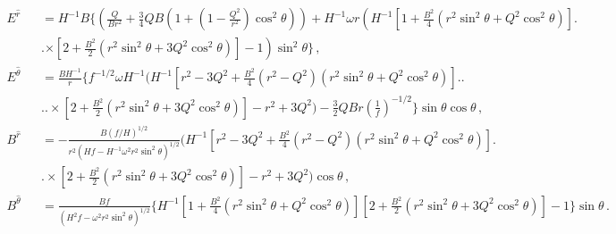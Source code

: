 \documentclass[showpacs,twocolumn,superscriptaddress]{revtex4}
\begin{document}
\begin{widetext}
\begin{eqnarray}
%
\label{e1}E^{\hat r} &&= H^{-1}B\Bigg\{
\left(\frac{Q}{Br^2}+\frac{3}{4}Q
B\left(1+\left(1-\frac{Q^2}{r^2}\right)\cos^2\theta\right)\right)
 +H^{-1}\omega r\left(H^{-1}\left[1+\frac{B^2}{4}\left(r^2\sin^2\theta
+
Q^2\cos^2\theta\right)\right]\right.\Bigg.\nonumber\\
%
&&\Bigg.\left.\times \left[2+\frac{B^2}{2}\left(r^2\sin^2\theta +
3Q^2\cos^2\theta\right)\right]-1\right)\sin^2\theta\Bigg\} \, ,\\
%
\label{e2}  E^{\hat \theta}&&
=\frac{BH^{-1}}{r}\Bigg\{f^{-1/2}\omega
H^{-1}\Bigg(H^{-1}\left[r^2-3Q^2+\frac{B^2}{4}\left(
r^2-Q^2\right)\left(r^2\sin^2\theta +
Q^2\cos^2\theta\right)\right]\Bigg.\Bigg.\nonumber\\
%
&&\Bigg.\Bigg.\times \left[2+\frac{B^2}{2}\left(r^2\sin^2\theta
+
3Q^2\cos^2\theta\right)\right]-r^2+3Q^2\Bigg) -\frac{3}{2}Q B
r\left(\frac{1}{f}\right)^{-1/2}\Bigg\} \sin\theta\cos\theta
 \, ,\\
%
\label{b1}  B^{\hat r} &&=-\frac{B(f/H)^{1/2}}{r^2\left(H
f-H^{-1}\omega^2r^2\sin^2\theta\right)^{1/2}}\bigg(H^{-1}\left[r^2-3Q^2+\frac{B^2}{4}\left(
r^2-Q^2\right)\left(r^2\sin^2\theta +
Q^2\cos^2\theta\right)\right]\Bigg.\nonumber\\
%
&&\Bigg.\times\left[2+\frac{B^2}{2}\left(r^2\sin^2\theta +
3Q^2\cos^2\theta\right)\right]
-r^2+3Q^2\bigg)\cos\theta \, , \\
%
\label{b2}  B^{\hat\theta} && =\frac{B f}{\left(H^2
f-\omega^2r^2\sin^2\theta\right)^{1/2}}\bigg\{H^{-1}\left[1+\frac{B^2}{4}\left(r^2\sin^2\theta
+
Q^2\cos^2\theta\right)\right]\left[2+\frac{B^2}{2}\left(r^2\sin^2\theta
+ 3Q^2\cos^2\theta\right)\right]-1\bigg\}\sin\theta \, .\nonumber\\
%
\end{eqnarray}
\end{widetext}
%
\end{document}

